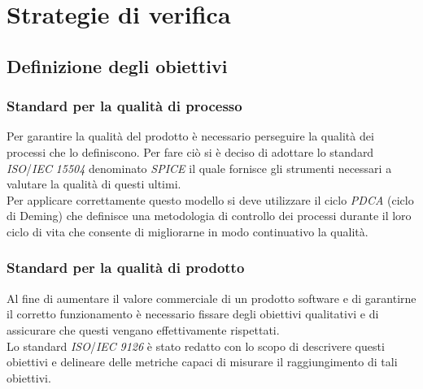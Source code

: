 \newpage
\section{Strategie di verifica}
\subsection{Definizione degli obiettivi}
\subsubsection{Standard per la qualità di processo}
Per garantire la qualità del prodotto è necessario perseguire la qualità dei processi che lo definiscono. Per fare ciò si è deciso di adottare lo standard \textit{ISO}/\textit{IEC} \textit{15504} denominato \textit{SPICE} il quale fornisce gli strumenti necessari a valutare la qualità di questi ultimi.\\
Per applicare correttamente questo modello si deve utilizzare il ciclo \textit{PDCA} (ciclo di Deming) che definisce una metodologia di controllo dei processi durante il loro ciclo di vita che consente di migliorarne in modo continuativo la qualità. 

\subsubsection{Standard per la qualità di prodotto}
Al fine di aumentare il valore commerciale di un prodotto software e di garantirne il corretto funzionamento è necessario fissare degli obiettivi qualitativi e di assicurare che questi vengano effettivamente rispettati.\\
Lo standard \textit{ISO}/\textit{IEC} \textit{9126} è stato redatto con lo scopo di descrivere questi obiettivi e delineare delle metriche capaci di misurare il raggiungimento di tali obiettivi.

